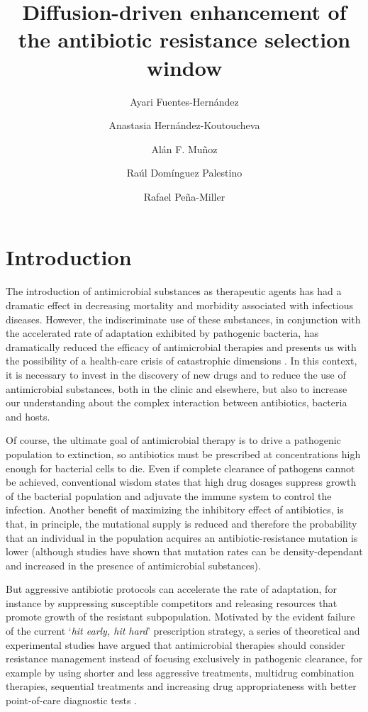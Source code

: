 \documentclass[fleqn,12pt]{wlscirep}
\title{Diffusion-driven enhancement of the antibiotic resistance selection window}
\author[1,*]{Ayari Fuentes-Hern\'andez}
\author[1,$\dag$]{Anastasia Hern\'andez-Koutoucheva}
\author[1,$\dag$]{Al\'an F. Mu\~noz}
\author[1,$\dag$]{Ra\'ul Dom\'inguez Palestino}
\author[1]{Rafael Pe\~na-Miller}
\affil[1]{  \, Laboratorio de Biolog\'ia Sint\'etica y de Sistemas, Centro de Ciencias Gen\'omicas, Universidad Nacional Aut\'onoma de M\'exico, 62210, Cuernavaca, M\'exico}
\affil[*]{Corresponding author: ayarifh@ccg.unam.mx}
\affil[$\dag$]{These authors contributed equally to this work}
\begin{document}
\flushbottom
\maketitle
\vspace{-10pt}
\thispagestyle{empty}

\section*{Introduction}

The introduction of antimicrobial substances as therapeutic agents has had a dramatic effect in decreasing mortality and morbidity associated with infectious diseases. However, the indiscriminate use of these substances, in conjunction with the accelerated rate of adaptation exhibited by pathogenic bacteria, has dramatically reduced the efficacy of antimicrobial therapies and presents us with the possibility of a health-care crisis of catastrophic dimensions \cite{WHO2014}. In this context, it is necessary to invest in the discovery of new drugs\cite{AMR2015} and to reduce the use of antimicrobial substances, both in the clinic\cite{Lee2013} and elsewhere\cite{Meek2015}, but also to increase our understanding about the complex interaction between antibiotics, bacteria and hosts.

Of course, the ultimate goal of antimicrobial therapy is to drive a pathogenic population to extinction, so antibiotics must be prescribed at concentrations high enough for bacterial cells to die. Even if complete clearance of pathogens cannot be achieved, conventional wisdom states that high drug dosages suppress growth of the bacterial population and adjuvate the immune system to control the infection. Another benefit of maximizing the inhibitory effect of antibiotics, is that, in principle, the mutational supply is reduced and therefore the probability that an individual in the population acquires an antibiotic-resistance mutation is lower\cite{Stratton2003} (although studies have shown that mutation rates can be density-dependant \cite{Richards2017} and increased in the presence of antimicrobial substances\cite{Galhardo2007}).

But aggressive antibiotic protocols can accelerate the rate of adaptation, for instance by suppressing susceptible competitors and releasing resources that promote growth of the resistant subpopulation\cite{PenaMiller2013}. Motivated by the evident failure of the current `{\em hit early, hit hard}' prescription strategy\cite{Read2011}, a series of theoretical and experimental studies have argued that antimicrobial therapies should consider resistance management instead of focusing exclusively in pathogenic clearance, for example by using shorter \cite{Geli2012} and less aggressive \cite{Kouyos2014} treatments, multidrug combination therapies\cite{Hegreness2008,Baym2016}, sequential treatments \cite{Kim2014,Imamovic2013,FuentesHernandez2015} and increasing drug appropriateness with better point-of-care diagnostic tests \cite{Beardmore2017,McAdams2018}.
\end{document}
